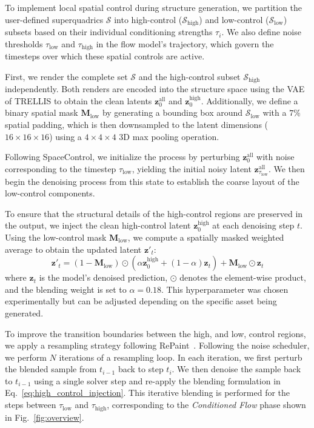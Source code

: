 To implement local spatial control during structure generation, we partition the user-defined superquadrics $\mathcal{S}$ into high-control ($\mathcal{S}_{\text{high}}$) and low-control ($\mathcal{S}_{\text{low}}$) subsets based on their individual conditioning strengths $\tau_i$. We also define noise thresholds $\tau_{\text{low}}$ and $\tau_{\text{high}}$ in the flow model's trajectory, which govern the timesteps over which these spatial controls are active. 

First, we render the complete set $\mathcal{S}$ and the high-control subset $\mathcal{S}_{\text{high}}$ independently. Both renders are encoded into the structure space using the VAE of TRELLIS to obtain the clean latents $\mathbf{z}_0^{\text{all}}$ and $\mathbf{z}_0^{\text{high}}$. Additionally, we define a binary spatial mask $\mathbf{M}_{\text{low}}$ by generating a bounding box around $\mathcal{S}_{\text{low}}$ with a $7\%$ spatial padding, which is then downsampled to the latent dimensions ($16 \times 16 \times 16$) using a $4 \times 4 \times 4$ 3D max pooling operation.

Following SpaceControl, we initialize the process by perturbing $\mathbf{z}_0^{\text{all}}$ with noise corresponding to the timestep $\tau_{\text{low}}$, yielding the initial noisy latent $\mathbf{z}_{\tau_{\text{low}}}^{\text{all}}$. We then begin the denoising process from this state to establish the coarse layout of the low-control components.

To ensure that the structural details of the high-control regions are preserved in the output, we inject the clean high-control latent $\mathbf{z}_0^{\text{high}}$ at each denoising step $t$. Using the low-control mask $\mathbf{M}_{\text{low}}$, we compute a spatially masked weighted average to obtain the updated latent $\mathbf{z}'_t$:
\begin{equation}
\mathbf{z}'_t = (1 - \mathbf{M}_{\text{low}}) \odot \left( \alpha \mathbf{z}_0^{\text{high}} + (1 - \alpha) \mathbf{z}_t \right) + \mathbf{M}_{\text{low}} \odot \mathbf{z}_t
\label{eq:high_control_injection}
\end{equation}
where $\mathbf{z}_t$ is the model's denoised prediction, $\odot$ denotes the element-wise product, and the blending weight is set to $\alpha = 0.18$. This hyperparameter was chosen experimentally but can be adjusted depending on the specific asset being generated.

To improve the transition boundaries between the high, and low, control regions, we apply a resampling strategy following RePaint~\cite{lugmayr2022repaint}. Following the noise scheduler, we perform $N$ iterations of a resampling loop. In each iteration, we first perturb the blended sample from $t_{i-1}$ back to step $t_i$. We then denoise the sample back to $t_{i-1}$ using a single solver step and re-apply the blending formulation in Eq.~\eqref{eq:high_control_injection}. This iterative blending is performed for the steps between $\tau_{\text{low}}$ and $\tau_{\text{high}}$, corresponding to the \textit{Conditioned Flow} phase shown in Fig.~\ref{fig:overview}.


